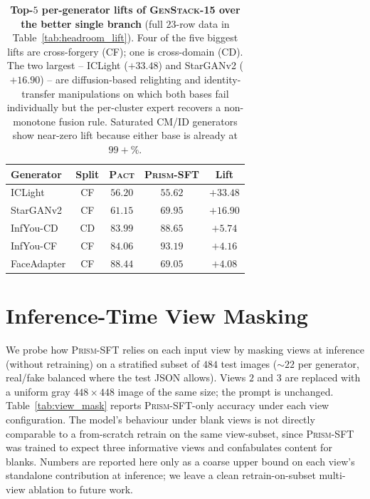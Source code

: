 \documentclass[10pt,twocolumn,letterpaper]{article}
\newcommand{\vfive}{\textsc{Pact}}
\newcommand{\prism}{\textsc{Prism-SFT}}
\begin{document}
\begin{table}[t]
\centering
\footnotesize
\setlength{\tabcolsep}{4pt}
\caption{\textbf{Top-$5$ per-generator lifts of \textsc{GenStack-15} over the better single branch} (full $23$-row data in Table~\ref{tab:headroom_lift}). Four of the five biggest lifts are cross-forgery (CF); one is cross-domain (CD). The two largest -- ICLight ($+33.48$) and StarGANv2 ($+16.90$) -- are diffusion-based relighting and identity-transfer manipulations on which both bases fail individually but the per-cluster expert recovers a non-monotone fusion rule. Saturated CM/ID generators show near-zero lift because either base is already at $99{+}\%$.}
\label{tab:lift_top5}
\begin{tabular}{l c c c c}
\toprule
Generator & Split & \vfive & \prism & Lift \\
\midrule
ICLight     & CF & $56.20$ & $55.62$ & $\mathbf{+33.48}$ \\
StarGANv2   & CF & $61.15$ & $69.95$ & $\mathbf{+16.90}$ \\
InfYou-CD   & CD & $83.99$ & $88.65$ & $+5.74$ \\
InfYou-CF   & CF & $84.06$ & $93.19$ & $+4.16$ \\
FaceAdapter & CF & $88.44$ & $69.05$ & $+4.08$ \\
\bottomrule
\end{tabular}
\end{table}

\section{Inference-Time View Masking}
\label{sec:view_masking}

We probe how \prism{} relies on each input view by masking views at inference (without retraining) on a stratified subset of $484$ test images ($\sim\!22$ per generator, real/fake balanced where the test JSON allows). Views $2$ and $3$ are replaced with a uniform gray $448{\times}448$ image of the same size; the prompt is unchanged. Table~\ref{tab:view_mask} reports \prism{}-only accuracy under each view configuration. The model's behaviour under blank views is not directly comparable to a from-scratch retrain on the same view-subset, since \prism{} was trained to expect three informative views and confabulates content for blanks. Numbers are reported here only as a coarse upper bound on each view's standalone contribution at inference; we leave a clean retrain-on-subset multi-view ablation to future work.
\end{document}
